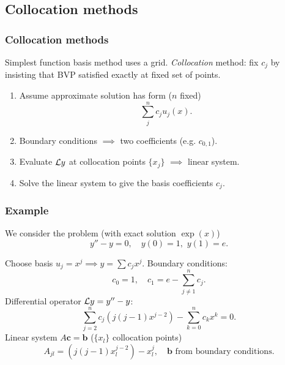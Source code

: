 \documentclass{beamer}
\newcommand{\bfm}[1]{{\boldsymbol{#1}}}
\begin{document}
\subsection{Collocation methods}


\begin{frame}
  \frametitle{Collocation methods}

  Simplest function basis method uses a grid.  \emph{Collocation}
  method: fix $c_j$ by insisting that BVP satisfied exactly at fixed
  set of points. \pause

  \vspace{1ex}

  \begin{enumerate}
  \item<2-> Assume approximate solution has form ($n$ fixed)
    \begin{equation*}
       \sum_{j}^n c_j u_j (x).
    \end{equation*}
  \item<3-> Boundary conditions $\implies$ two coefficients
    (e.g. $c_{0, 1}$).
  \item<4-> Evaluate ${\cal L} y$ at collocation points $\{x_j\}$
    $\implies$ linear system.
  \item<5-> Solve the linear system to give the basis coefficients
    $c_j$.
  \end{enumerate}

\end{frame}

\begin{frame}
  \frametitle{Example}

  We consider the problem (with exact solution $\exp(x)$)
  \begin{equation*}
    y'' - y = 0, \quad y(0) = 1, \,\, y(1) = e.
  \end{equation*} \pause

  Choose basis $u_j = x^j \implies y = \sum c_j x^j$. \pause Boundary
  conditions:
  \begin{equation*}
    c_0 = 1, \quad c_1 = e - \sum_{j \ne 1}^n c_j.
  \end{equation*} \pause
  Differential operator ${\cal L} y = y'' - y$:
  \begin{equation*}
    \sum_{j=2}^n c_j \left( j (j - 1) x^{j-2} \right) - \sum_{k=0}^n
    c_k x^k = 0.
  \end{equation*} \pause
  Linear system $A \bfm{c} = \bfm{b}$ ($\{ x_l\}$ collocation points)
  \begin{equation*}
    A_{j l} = \left( j (j - 1) x_l^{j-2} \right) - x_l^j , \quad
    \bfm{b} \text{ from boundary conditions.}
  \end{equation*}

\end{frame}
\end{document}
